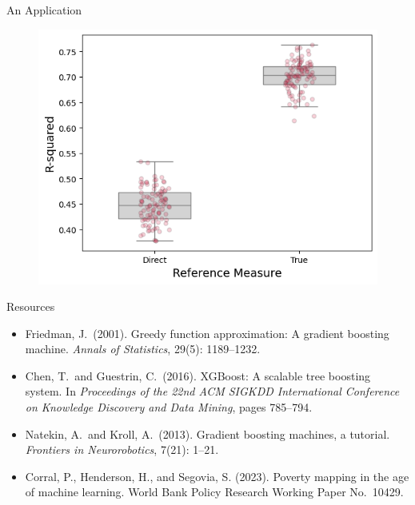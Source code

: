\documentclass[aspectratio=169, xcolor=dvipsnames]{beamer}
\begin{document}
\begin{frame}{An Application}
\begin{figure}[h!]
  \centering
  \includegraphics[width=0.6 \textwidth]{Plot}
\end{figure}
\end{frame}

\begin{frame}{Resources}
\begin{itemize}
\item Friedman, J.\ (2001). Greedy function approximation: A gradient boosting machine.
\textit{Annals of Statistics}, 29(5): 1189--1232.
\item Chen, T.\ and Guestrin, C.\ (2016). XGBoost: A scalable tree boosting system. In
\textit{Proceedings of the 22nd ACM SIGKDD International Conference on Knowledge 
Discovery and Data Mining}, pages 785--794.
\item Natekin, A.\ and Kroll, A.\ (2013). Gradient boosting machines, a tutorial. 
\textit{Frontiers in Neurorobotics}, 7(21): 1--21.
\item Corral, P., Henderson, H., and Segovia, S. (2023). Poverty mapping in the
age of machine learning. World Bank Policy Research Working Paper No.\ 10429.
\end{itemize}
\end{frame}
\end{document}
